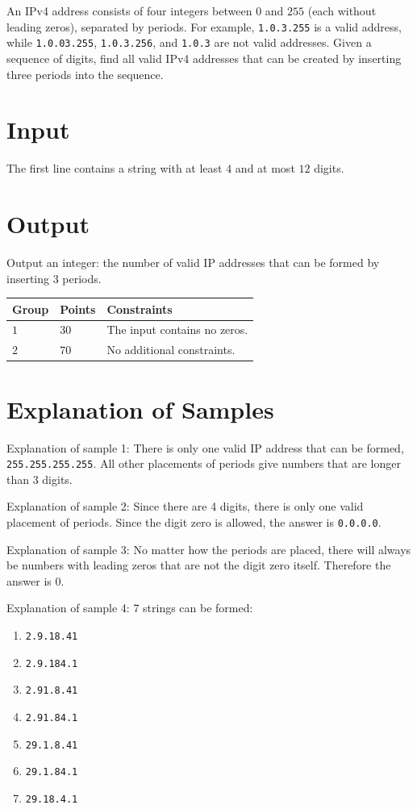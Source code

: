 An IPv4 address consists of four integers between $0$ and $255$ (each without leading zeros), separated by periods.
For example, \texttt{1.0.3.255} is a valid address, while \texttt{1.0.03.255}, \texttt{1.0.3.256}, and \texttt{1.0.3} are not valid addresses.
Given a sequence of digits, find all valid IPv4 addresses that can be created by inserting three periods into the sequence.

\section*{Input}
The first line contains a string with at least $4$ and at most $12$ digits.

\section*{Output}
Output an integer: the number of valid IP addresses that can be formed by inserting 3 periods.


\noindent
\begin{tabular}{| l | l | p{12cm} |}
  \hline
  \textbf{Group} & \textbf{Points} & \textbf{Constraints} \\ \hline
  $1$    & $30$        & The input contains no zeros. \\ \hline 
  $2$    & $70$        & No additional constraints. \\ \hline 
\end{tabular}


\section*{Explanation of Samples}
Explanation of sample 1: There is only one valid IP address that can be formed, \texttt{255.255.255.255}. All other placements of periods give numbers that are longer than 3 digits.

Explanation of sample 2: Since there are 4 digits, there is only one valid placement of periods. Since the digit zero is allowed, the answer is \texttt{0.0.0.0}.

Explanation of sample 3: No matter how the periods are placed, there will always be numbers with leading zeros that are not the digit zero itself. Therefore the answer is 0.

Explanation of sample 4: 7 strings can be formed$\colon$
\begin{enumerate}
    \item \texttt{2.9.18.41}
    \item \texttt{2.9.184.1}
    \item \texttt{2.91.8.41}
    \item \texttt{2.91.84.1}
    \item \texttt{29.1.8.41}
    \item \texttt{29.1.84.1}
    \item \texttt{29.18.4.1}
\end{enumerate}
